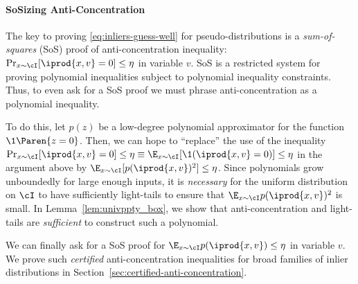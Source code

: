 
\paragraph{SoSizing Anti-Concentration} The key to proving \eqref{eq:inliers-guess-well} for pseudo-distributions is a \emph{sum-of-squares} (SoS) proof of anti-concentration inequality: $\Pr_{x \sim \cI} [\iprod{x,v} =0] \leq \eta$ in variable $v$. SoS is a restricted system for proving polynomial inequalities subject to polynomial inequality constraints. Thus, to even ask for a SoS proof we must phrase anti-concentration as a polynomial inequality. 

To do this, let $p(z)$ be a low-degree polynomial approximator for the function $\1\Paren{ z=0}$. 
Then, we can hope to ``replace'' the use of the inequality $\Pr_{x \sim \cI} [\iprod{x,v} =0] \leq \eta \equiv \E_{x \sim \cI} [\1(\iprod{x,v} = 0)] \leq \eta$ in the argument above by $\E_{x \sim \cI}[ p(\iprod{x,v})^2] \leq \eta$. Since  polynomials grow unboundedly for large enough inputs, it is \emph{necessary} for the uniform distribution on $\cI$ to have sufficiently light-tails to ensure that $\E_{x \sim \cI} p(\iprod{x,v})^2$ is small. In Lemma~\ref{lem:univppty_box}, we show that anti-concentration and light-tails are \emph{sufficient} to construct such a polynomial. 

We can finally ask for a SoS proof for $\E_{x \sim \cI} p(\iprod{x,v}) \leq \eta$ in variable $v$. We prove such \emph{certified} anti-concentration inequalities for broad families of inlier distributions in Section~\ref{sec:certified-anti-concentration}.



